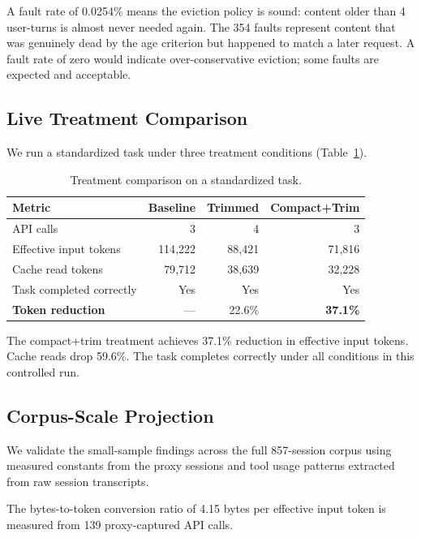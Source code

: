 A fault rate of 0.0254\% means the eviction policy is sound:
content older than 4 user-turns is almost never needed again. The
354 faults represent content that was genuinely dead by the age
criterion but happened to match a later request. A fault rate of
zero would indicate over-conservative eviction; some faults are
expected and acceptable.

\subsection{Live Treatment Comparison}
\label{sec:treatment}

We run a standardized task under three treatment conditions
(Table~\ref{tab:treatment}).

\begin{table}[ht]
\centering
\caption{Treatment comparison on a standardized task.}
\label{tab:treatment}
\small
\begin{tabular}{@{}lrrr@{}}
\toprule
\textbf{Metric} & \textbf{Baseline} & \textbf{Trimmed} & \textbf{Compact+Trim} \\
\midrule
API calls & 3 & 4 & 3 \\
Effective input tokens & 114{,}222 & 88{,}421 & 71{,}816 \\
Cache read tokens & 79{,}712 & 38{,}639 & 32{,}228 \\
Task completed correctly & Yes & Yes & Yes \\
\midrule
\textbf{Token reduction} & --- & 22.6\% & \textbf{37.1\%} \\
\bottomrule
\end{tabular}
\end{table}

The compact+trim treatment achieves 37.1\% reduction in effective
input tokens. Cache reads drop 59.6\%. The task completes correctly
under all conditions in this controlled run.

\subsection{Corpus-Scale Projection}
\label{sec:corpus-projection}

We validate the small-sample findings across the full 857-session
corpus using measured constants from the proxy sessions and tool
usage patterns extracted from raw session transcripts.

The bytes-to-token conversion ratio of 4.15 bytes per effective
input token is measured from 139 proxy-captured API calls.

